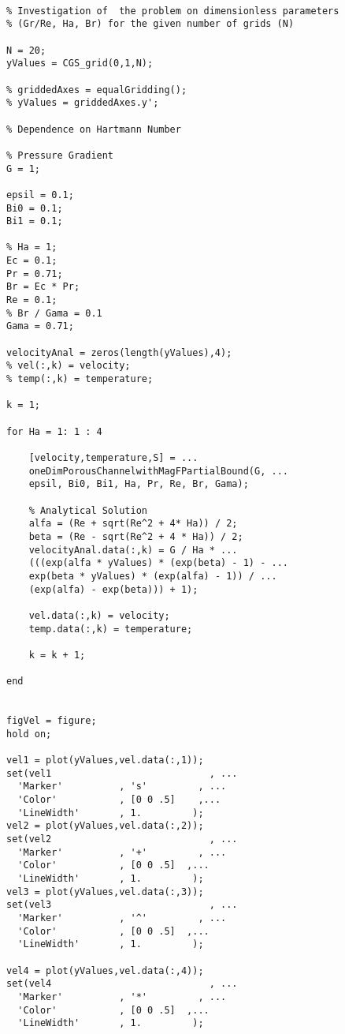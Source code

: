 \begin{lstlisting}

% Investigation of  the problem on dimensionless parameters
% (Gr/Re, Ha, Br) for the given number of grids (N)

N = 20;
yValues = CGS_grid(0,1,N);

% griddedAxes = equalGridding();
% yValues = griddedAxes.y';

% Dependence on Hartmann Number

% Pressure Gradient
G = 1;

epsil = 0.1;
Bi0 = 0.1;
Bi1 = 0.1;

% Ha = 1;
Ec = 0.1;
Pr = 0.71;
Br = Ec * Pr;
Re = 0.1;
% Br / Gama = 0.1
Gama = 0.71;

velocityAnal = zeros(length(yValues),4);
% vel(:,k) = velocity;
% temp(:,k) = temperature;

k = 1;

for Ha = 1: 1 : 4
    
    [velocity,temperature,S] = ...
    oneDimPorousChannelwithMagFPartialBound(G, ...
    epsil, Bi0, Bi1, Ha, Pr, Re, Br, Gama);
    
    % Analytical Solution
    alfa = (Re + sqrt(Re^2 + 4* Ha)) / 2;
    beta = (Re - sqrt(Re^2 + 4 * Ha)) / 2;
    velocityAnal.data(:,k) = G / Ha * ...
    (((exp(alfa * yValues) * (exp(beta) - 1) - ...
    exp(beta * yValues) * (exp(alfa) - 1)) / ...
    (exp(alfa) - exp(beta))) + 1);
    
    vel.data(:,k) = velocity;
    temp.data(:,k) = temperature;
    
    k = k + 1;

end


figVel = figure;
hold on;

vel1 = plot(yValues,vel.data(:,1));
set(vel1                            , ...
  'Marker'          , 's'         , ...
  'Color'           , [0 0 .5]    ,...
  'LineWidth'       , 1.         );
vel2 = plot(yValues,vel.data(:,2));
set(vel2                            , ...
  'Marker'          , '+'         , ...
  'Color'           , [0 0 .5]  ,...
  'LineWidth'       , 1.         );
vel3 = plot(yValues,vel.data(:,3));
set(vel3                            , ...
  'Marker'          , '^'         , ...
  'Color'           , [0 0 .5]  ,...
  'LineWidth'       , 1.         );

vel4 = plot(yValues,vel.data(:,4));
set(vel4                            , ...
  'Marker'          , '*'         , ...
  'Color'           , [0 0 .5]  ,...
  'LineWidth'       , 1.         );



\end{lstlisting}
